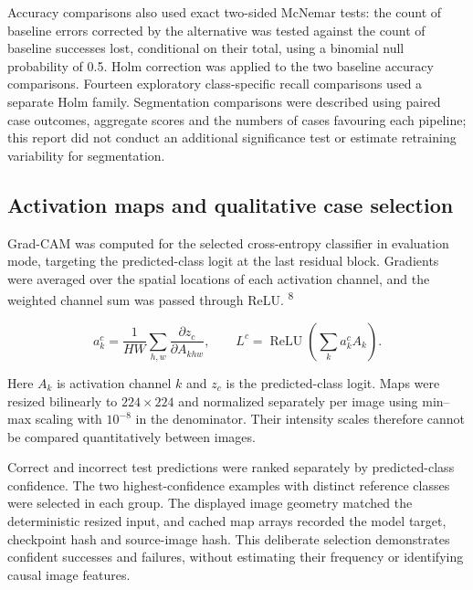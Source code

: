 \documentclass[11pt,a4paper]{article}
\begin{document}
Accuracy comparisons also used exact two-sided McNemar tests: the count of baseline errors corrected by the alternative was tested against the count of baseline successes lost, conditional on their total, using a binomial null probability of 0.5. Holm correction was applied to the two baseline accuracy comparisons. Fourteen exploratory class-specific recall comparisons used a separate Holm family. Segmentation comparisons were described using paired case outcomes, aggregate scores and the numbers of cases favouring each pipeline; this report did not conduct an additional significance test or estimate retraining variability for segmentation.



\subsection*{Activation maps and qualitative case selection}

Grad-CAM was computed for the selected cross-entropy classifier in evaluation mode, targeting the predicted-class logit at the last residual block. Gradients were averaged over the spatial locations of each activation channel, and the weighted channel sum was passed through ReLU. \textsuperscript{8}




\begin{equation}
\label{eq:gradcam}
a_k^c=\frac{1}{HW}\sum_{h,w}\frac{\partial z_c}{\partial A_{khw}},\qquad L^c=\operatorname{ReLU}\!\left(\sum_k a_k^c A_k\right).
\end{equation}


Here $A_k$ is activation channel $k$ and $z_c$ is the predicted-class logit. Maps were resized bilinearly to $224\times224$ and normalized separately per image using min–max scaling with $10^{-8}$ in the denominator. Their intensity scales therefore cannot be compared quantitatively between images.



Correct and incorrect test predictions were ranked separately by predicted-class confidence. The two highest-confidence examples with distinct reference classes were selected in each group. The displayed image geometry matched the deterministic resized input, and cached map arrays recorded the model target, checkpoint hash and source-image hash. This deliberate selection demonstrates confident successes and failures, without estimating their frequency or identifying causal image features.
\end{document}
